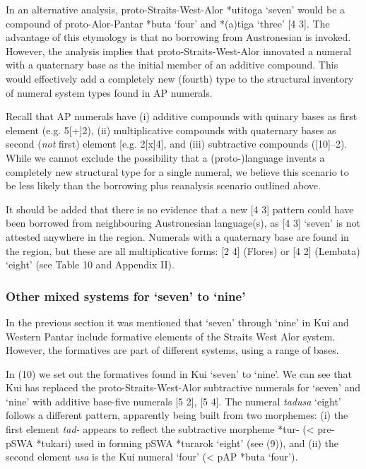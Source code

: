 {In an alternative analysis, proto-Straits-West-Alor *{\texthtb}utitoga `seven' would be a compound of proto-Alor-Pantar *buta `four' and *(a)tiga `three' [4 3]. The advantage of this etymology is that no borrowing from Austronesian is invoked. However, the analysis implies that proto-Straits-West-Alor innovated a numeral with a quaternary base as the initial member of an additive compound. This would effectively add a completely new (fourth) type to the structural inventory of numeral system types found in AP numerals.

Recall that AP numerals have (i) additive compounds with quinary bases as first element (e.g. 5[+]2), (ii) multiplicative compounds with quaternary bases as second (\textit{not} first) element [e.g. 2[x]4], and (iii) subtractive compounds ([10]--2). While we cannot exclude the possibility that a (proto-)language invents a completely new structural type for a single numeral, we believe this scenario to be less likely than the borrowing plus reanalysis scenario outlined above.

It should be added that there is no evidence that a new [4 3] pattern could have been borrowed from neighbouring Austronesian language(s), as [4 3] `seven' is not attested anywhere in the region. Numerals with a quaternary base are found in the region, but these are all multiplicative forms: [2 4] (Flores) or [4 2] (Lembata) `eight' (see Table 10  and Appendix II).

\subsubsection{Other mixed systems for `seven' to `nine'}
In the previous section it was mentioned that `seven' through `nine' in Kui and Western Pantar include formative elements of the Straits West Alor system. However, the formatives are part of different systems, using a range of bases.

In (10) we set out the formatives found in Kui `seven' to `nine'. We can see that Kui has replaced the proto-Straits-West-Alor subtractive numerals for `seven' and `nine' with additive base-five numerals [5 2], [5 4]. The numeral \textit{tadusa} `eight' follows a different pattern, apparently being built from two morphemes: (i) the first element \textit{tad-} appears to reflect the subtractive morpheme *tur- ({\textless} pre-pSWA *tukari) used in forming pSWA *turarok `eight' (see (9)), and (ii) the second element \textit{usa} is the Kui numeral `four' ({\textless} pAP *buta `four').



}
